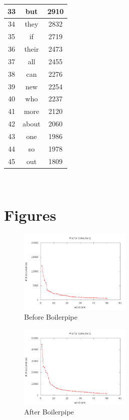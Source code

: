 \documentclass{article}
\begin{document}
\begin{table}
\begin{center}
\begin{tabular}{ c | c | c }
33 & but & 2910 \\ \hline
34 & they & 2832 \\ \hline
35 & if & 2719 \\ \hline
36 & their & 2473 \\ \hline
37 & all & 2455 \\ \hline
38 & can & 2276 \\ \hline
39 & new & 2254 \\ \hline
40 & who & 2237 \\ \hline
41 & more & 2120 \\ \hline
42 & about & 2060 \\ \hline
43 & one & 1986 \\ \hline
44 & so & 1978 \\ \hline
45 & out & 1809 \\ \hline

    \hline

  \end{tabular}
\end{center}
\end{table} ​

\clearpage

\section{Figures}

\begin{center}
\begin{figure}[ht]
    \centering
    \includegraphics[width=0.475\textwidth,natwidth=700,natheight=700]{wget.png}
    \caption{Before Boilerpipe}
    \label{fig:wget.png}
\end{figure}
\end{center}

\begin{center}
\begin{figure}[ht]
    \centering
    \includegraphics[width=0.475\textwidth,natwidth=700,natheight=700]{boilerpipe.png}
    \caption{After Boilerpipe}
    \label{fig:boilerpipe.png}
\end{figure}
\end{center}




\clearpage
\end{document}
